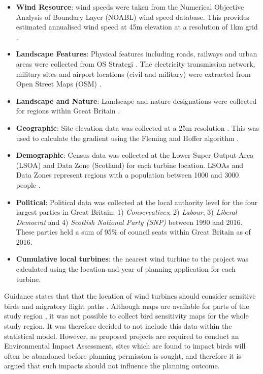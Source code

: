 \documentclass[a4paper,]{article}
\providecommand{\tightlist}{%
  \setlength{\itemsep}{0pt}\setlength{\parskip}{0pt}}
\theoremstyle{definition}
\theoremstyle{definition}
\theoremstyle{definition}
\theoremstyle{remark}
\begin{document}
\begin{itemize}
\tightlist
\item
  \textbf{Wind Resource}: wind speeds were taken from the Numerical Objective Analysis of Boundary Layer (NOABL) wind speed database. This provides estimated annualised wind speed at 45m elevation at a resolution of 1km grid \citep{DTI2001}.
\item
  \textbf{Landscape Features}: Physical features including roads, railways and urban areas were collected from OS Strategi \citep{Survey2016}. The electricity transmission network, military sites and airport locations (civil and military) were extracted from Open Street Maps (OSM) \citep{Overpass2016}.
\item
  \textbf{Landscape and Nature}: Landscape and nature designations were collected for regions within Great Britain \citep{Pope2017}.
\item
  \textbf{Geographic}: Site elevation data was collected at a 25m resolution \citep{Commission2015}. This was used to calculate the gradient using the Fleming and Hoffer algorithm \citep{Fleming1979}.
\item
  \textbf{Demographic}: Census data was collected at the Lower Super Output Area (LSOA) and Data Zone (Scotland) for each turbine location. LSOAs and Data Zones represent regions with a population between 1000 and 3000 people \citep{OfficeforNationalStatistics}.\\
\item
  \textbf{Political}: Political data was collected at the local authority level for the four largest parties in Great Britain: 1) \emph{Conservatives}; 2) \emph{Labour}, 3) \emph{Liberal Democrat} and 4) \emph{Scottish National Party (SNP)} between 1990 and 2016. These parties held a sum of 95\% of council seats within Great Britain as of 2016.
\item
  \textbf{Cumulative local turbines}: the nearest wind turbine to the project was calculated using the location and year of planning application for each turbine.
\end{itemize}

Guidance states that that the location of wind turbines should consider sensitive birds and migratory flight paths \citep{Gove2013}. Although maps are available for parts of the study region \citep{Bright2006}, it was not possible to collect bird sensitivity maps for the whole study region. It was therefore decided to not include this data within the statistical model. However, as proposed projects are required to conduct an Environmental Impact Assessment, sites which are found to impact birds will often be abandoned before planning permission is sought, and therefore it is argued that such impacts should not influence the planning outcome.
\end{document}
